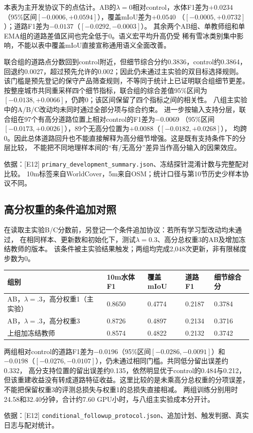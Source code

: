 \documentclass[UTF8,fontset=fandol,zihao=5,a4paper]{ctexart}
\newcommand{\source}[1]{\par{\footnotesize\color{muted}依据：#1}\par}
\begin{document}
本表为主开发协议下的点估计。AB的$\lambda=0$相对control，水体F1差为$+0.0234$
（95\%区间$[-0.0006,+0.0594]$），覆盖mIoU差为$+0.0540$
（$[-0.0005,+0.0732]$）；道路F1差为$-0.0137$（$[-0.0292,-0.0003]$）。
其余两个AB组、单教师组和单EMA组的道路差值区间也完全低于0。语义宏平均升高仍受
稀有雪冰类别集中影响，不能以表中覆盖mIoU直接宣称通用语义全面改善。

联合组的道路点分数回到control附近，但细节综合分约0.3836，control约0.3864，
回退约0.0027，超过预先允许的0.002；因此仍未通过主实验的双目标选择规则。
该门槛是预先登记的保守产品筛查规则，不等同于统计上已证明联合组细节更差。
按整座城市共同重采样四个细节指标，联合组的综合差值95\%区间为
$[-0.0138,+0.0066]$，仍跨0；该区间保留了四个指标之间的相关性。
八组主实验中的A/B/C改动均未同时通过全部分项与综合约束。
进一步按输入支持分层，联合组在97个有高分道路位置上相对control的F1差为$-0.0069$
（95\%区间$[-0.0173,+0.0026]$），89个无高分位置为$+0.0088$（$[-0.0182,+0.0268]$），
均跨0。因此总体道路回升也不能直接解释为高分细节增强。这是既有支持条件下的分层比较，
不能把不同地理样本间的“有/无高分”差异当作高分输入的因果效应。
\source{[E12] \texttt{primary\_development\_summary.json}、冻结探针混淆计数与完整配对比较。
10m标签来自WorldCover，5m来自OSM；统计口径与第10节历史少样本协议不同。}

\subsection{高分权重的条件追加对照}
在读取主实验B/C分数前，另登记一个条件追加协议：若所有学习型改动均未通过，
在相同样本、更新数和初始化下，测试$\lambda=0.3$、高分总权重3的AB及增加冻结教师的版本。
该条件被主实验结果触发；两组均完成2{,}048次更新，非有限梯度步数为0。

\noindent\begin{tabularx}{\linewidth}{@{}p{4.8cm}YYYY@{}}
\toprule 组别 & 10m水体F1 & 覆盖mIoU & 道路F1 & 细节综合分\\\midrule
AB，$\lambda=.3$，高分权重1（主实验） & 0.8650 & 0.4774 & 0.2187 & 0.3784\\
AB，$\lambda=.3$，高分权重3 & 0.8726 & 0.4897 & 0.2134 & 0.3716\\
上组加冻结教师 & 0.8574 & 0.4822 & 0.2132 & 0.3742\\\bottomrule
\end{tabularx}

两组相对control的道路F1差为$-0.0196$（95\%区间$[-0.0286,-0.0091]$）和
$-0.0198$（$[-0.0276,-0.0107]$），仍未通过相同门槛。共同低分留出误差约0.332，
高分支持位置的留出误差约0.135，依然明显优于control的0.484与0.212，
但该重建收益没有转成道路特征收益。这里比较的是未乘高分总权重的分项误差，
不能把保留权重3的评测总损失与权重1的总损失直接相减。
两组训练分别用时24.58和32.40分钟，合计约7.60 GPU小时，与八组主实验成本分开计。
\source{[E12] \texttt{conditional\_followup\_protocol.json}、追加计划、触发判据、真实日志与配对统计。}
\end{document}
